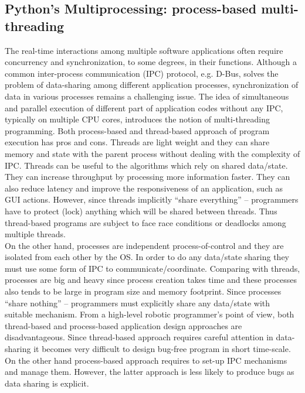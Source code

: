 \subsection{Python's Multiprocessing: process-based multi-threading}
\label{expt-tools:python}
The real-time interactions among multiple software applications often require concurrency and synchronization, to some degrees, in their functions. Although a common inter-process communication (IPC) protocol, e.g. D-Bus, solves the problem of data-sharing among different application processes, synchronization of data in various processes remains a challenging issue.   The idea of simultaneous and parallel execution of different part of application codes without any IPC, typically on  multiple CPU cores, introduces the notion of multi-threading programming. Both process-based and thread-based approach of  program execution has pros and cons. Threads are light weight and they can share memory and state with the parent process without dealing with the complexity of IPC.   Threads can be useful to the algorithms which rely on shared data/state. They can increase throughput by processing more information faster. They can also reduce latency and improve the responsiveness of an application, such as GUI actions. However, since threads  implicitly ``share everything'' – programmers have to protect (lock) anything which will be
shared between threads. Thus thread-based programs are subject to face race conditions or deadlocks among multiple threads.\\
On the other hand, processes are independent process-of-control and they are isolated from each other by the OS. In order to do any data/state sharing they must use some form of IPC to communicate/coordinate. Comparing with threads, processes are big and heavy since process creation takes time and these processes also tends to be large in program size and memory footprint.  Since processes ``share nothing'' -- programmers must explicitly
 share any data/state with suitable mechanism. From a high-level robotic programmer's point of view, both thread-based and process-based application design approaches are disadvantageous. Since thread-based approach requires careful attention in data-sharing it becomes very difficult to design bug-free program in short time-scale. On the other hand process-based approach requires to set-up IPC mechanisms and manage them. However, the latter approach is less likely to produce bugs as data sharing is explicit. 

